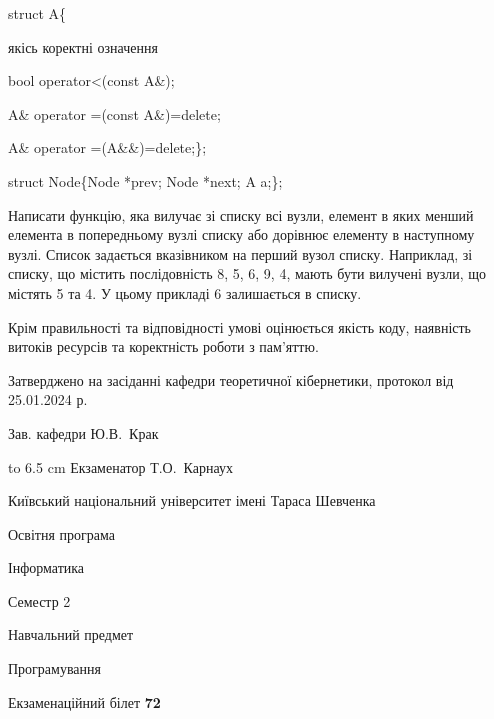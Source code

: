 \documentclass[12pt, ukrainian]{article}
\begin{document}
{struct A\{

\quad  якісь коректні означення 

\quad  bool operator<(const A\&); 

\quad A\& operator =(const A\&)=delete; 

\quad  A\& operator =(A\&\&)=delete;\};

struct Node\{Node *prev; Node *next; A a;\};

Написати функцію, яка вилучає зі списку всі вузли, елемент в яких менший елемента в попередньому вузлі списку або дорівнює елементу в наступному вузлі. Список задається вказівником на перший вузол списку. Наприклад, зі списку, що містить послідовність 8, 5, 6, 9, 4, мають бути вилучені вузли, що містять 5 та 4. У цьому прикладі 6 залишається в списку.

Крім правильності та відповідності умові оцінюється якість коду, наявність витоків ресурсів та коректність роботи з пам'яттю. 

}
{\smallskip\smallskip \begin {scriptsize} Затверджено на засіданні кафедри теоретичної кібернетики, протокол   від   25.01.2024 р.\par\smallskip\smallskip\smallskip\smallskip
{\parbox {6.5 cm} {Зав. кафедри \dotfill Ю.В.~Крак}}\hspace {0.7cm} {\hbox to 6.5 cm { Екзаменатор \dotfill Т.О.~Карнаух}} \end{scriptsize}}
\newpage
{{\begin {scriptsize}\par
{ \center  Київський національний університет імені Тараса Шевченка \par}
{\parbox {5 cm}{Освітня програма \hfill}{\parbox {7 cm}{Інформатика\hfill}}\parbox {6 cm}{\hfill Семестр 2}}\par
{\parbox {5 cm} {Навчальний предмет \hfill}\parbox {7 cm}{Програмування \hfill}\parbox {6cm}{\hfill}\par}\vspace{-15pt} \end{scriptsize}}{\center Екзаменаційний білет \No \textbf { 72 }\par}}
\end{document}
